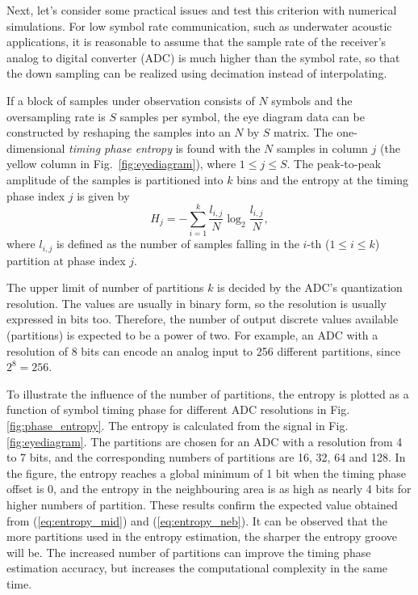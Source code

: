 \documentclass[journal,comsoc]{IEEEtran}
\begin{document}
Next, let's consider some practical issues and test this criterion with numerical simulations.
For low symbol rate communication, such as underwater acoustic applications, 
it is reasonable to assume that the sample rate of the receiver's analog to digital converter (ADC) is much higher than the symbol rate, so that the down sampling can be realized using 
decimation instead of interpolating.

If a block of  samples under observation consists of \(N\) symbols and the oversampling rate is \(S\) samples per symbol,
the eye diagram data can be constructed by reshaping the samples into an \(N\) by \(S\) matrix.
The one-dimensional \textit{timing phase entropy} is found with the \(N\) samples in column \(j\) (the yellow column in Fig.~\ref{fig:eyediagram}), where \(1 \le j \le S\). 
The peak-to-peak amplitude of the samples is partitioned into \(k\) bins and the entropy at the timing phase index \(j\) is given by 
\begin{equation}
H_j =  - \sum\limits_{i = 1}^k {\frac{l_{i,j}}{N}\log_2 \frac{l_{i,j}}{N}},
\label{eq:entropy_phase}
\end{equation}
where \(l_{i,j}\) is defined as the number of samples falling in the \(i\)-th (\(1 \le i \le k\)) partition at phase index $j$. 


The upper limit of number of partitions \(k\) is decided by the ADC's quantization resolution.
The values are usually in binary form, so the resolution is usually expressed in bits too.
Therefore, the number of output discrete values available (partitions) is expected to be a power of two. 
For example, an ADC with a resolution of 8 bits can encode an analog input to 256 different partitions, since \(2^8 = 256\). 

To illustrate the influence of the number of partitions, 
the entropy is plotted as a function of symbol timing phase for different ADC resolutions in Fig. \ref{fig:phase_entropy}.
The entropy is calculated from the signal in Fig. \ref{fig:eyediagram}.
The partitions are chosen for an ADC with a resolution from 4 to 7 bits,
and the corresponding numbers of partitions are 16, 32, 64 and 128.
In the figure, the entropy reaches a global minimum of 1 bit when the timing phase offset is 0, and the entropy in the neighbouring area is as high as nearly 4 bits for higher numbers of partition. 
These results confirm the expected value obtained from (\ref{eq:entropy_mid}) and (\ref{eq:entropy_neb}).
It can be observed that the more partitions used in the entropy estimation, the sharper the entropy groove will be.
The increased number of partitions can improve the timing phase estimation accuracy, but increases the computational complexity in the same time.
\end{document}
